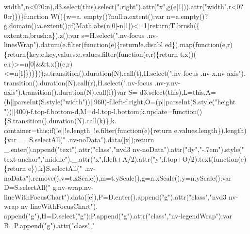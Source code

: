 \begin{DoxyCode}
{{      width"},n<0?0:n),d3.select(\textcolor{keyword}{this}).select(\textcolor{stringliteral}{".right"}).attr(\textcolor{stringliteral}{"x"},g(e[1])).attr(\textcolor{stringliteral}{"width"},r<0?0:r)\})\}\textcolor{keyword}{function} W()\{w=a.
      empty()?null:a.extent();var n=a.empty()?g.domain():a.extent();\textcolor{keywordflow}{if}(Math.abs(n[0]-n[1])<=1)\textcolor{keywordflow}{return};T.brush(\{
      extent:n,brush:a\}),z();var s=H.select(\textcolor{stringliteral}{".nv-focus .nv-linesWrap"}).datum(e.filter(\textcolor{keyword}{function}(e)\{return!e.disabl
      ed\}).map(\textcolor{keyword}{function}(e,r)\{\textcolor{keywordflow}{return}\{key:e.key,values:e.values.filter(\textcolor{keyword}{function}(e,r)\{\textcolor{keywordflow}{return} t.x()(
      e,r)>=n[0]&&t.x()(e,r)<=n[1]\})\}\}));s.transition().duration(N).call(t),H.select(\textcolor{stringliteral}{".nv-focus .nv-x.nv-axis"}).
      transition().duration(N).call(r),H.select(\textcolor{stringliteral}{".nv-focus .nv-y.nv-axis"}).transition().duration(N).call(i)\}var S=
      d3.select(\textcolor{keyword}{this}),L=\textcolor{keyword}{this},A=(h||parseInt(S.style(\textcolor{stringliteral}{"width"}))||960)-f.left-f.right,O=(p||parseInt(S.style(\textcolor{stringliteral}{"height
      "}))||400)-f.top-f.bottom-d,M=d-l.top-l.bottom;k.update=\textcolor{keyword}{function}()\{S.transition().duration(N).call(k)\},k.
      container=\textcolor{keyword}{this};\textcolor{keywordflow}{if}(!e||!e.length||!e.filter(\textcolor{keyword}{function}(e)\{return e.values.length\}).length)\{var \_=S.selectAll(\textcolor{stringliteral}{"
      .nv-noData"}).data([x]);\textcolor{keywordflow}{return} \_.enter().append(\textcolor{stringliteral}{"text"}).attr(\textcolor{stringliteral}{"class"},\textcolor{stringliteral}{"nvd3 nv-noData"}).attr(\textcolor{stringliteral}{"dy"},\textcolor{stringliteral}{"-.7em"}).style(\textcolor{stringliteral}{"
      text-anchor"},\textcolor{stringliteral}{"middle"}),\_.attr(\textcolor{stringliteral}{"x"},f.left+A/2).attr(\textcolor{stringliteral}{"y"},f.top+O/2).text(\textcolor{keyword}{function}(e)\{\textcolor{keywordflow}{return} e\}),k\}S.selectAll(\textcolor{stringliteral}{"
      .nv-noData"}).remove(),v=t.xScale(),m=t.yScale(),g=n.xScale(),y=n.yScale();var D=S.selectAll(\textcolor{stringliteral}{"
      g.nv-wrap.nv-lineWithFocusChart"}).data([e]),P=D.enter().append(\textcolor{stringliteral}{"g"}).attr(\textcolor{stringliteral}{"class"},\textcolor{stringliteral}{"nvd3 nv-wrap nv-lineWithFocusChart"}).
      append(\textcolor{stringliteral}{"g"}),H=D.select(\textcolor{stringliteral}{"g"});P.append(\textcolor{stringliteral}{"g"}).attr(\textcolor{stringliteral}{"class"},\textcolor{stringliteral}{"nv-legendWrap"});var B=P.append(\textcolor{stringliteral}{"g"}).attr(\textcolor{stringliteral}{"class"},\textcolor{stringliteral}{"
}}
\end{DoxyCode}
